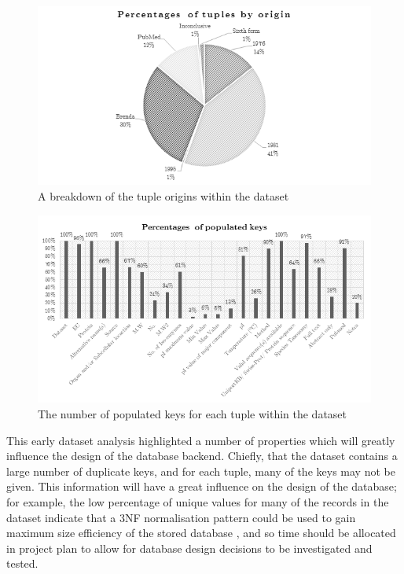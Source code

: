 \begin{figure}[H]
\centering
\includegraphics{assets/chart-dataset-origin.png}
\caption{A breakdown of the tuple origins within the dataset}
\label{fig:chart-dataset-origin}
\end{figure}

\newpage
\begin{figure}[H]
\centering
\includegraphics{assets/chart-dataset-populated.png}
\caption{The number of populated keys for each tuple within the dataset}
\label{fig:chart-dataset-populated}
\end{figure}

This early dataset analysis highlighted a number of properties which will
greatly influence the design of the database backend. Chiefly, that the dataset
contains a large number of duplicate keys, and for each tuple, many of the keys
may not be given. This information will have a great influence on the design of
the database; for example, the low percentage of unique values for many of the
records in the dataset indicate that a 3NF normalisation pattern could be used
to gain maximum size efficiency of the stored database \cite{Maier1983}, and so
time should be allocated in project plan to allow for database design decisions
to be investigated and tested.

